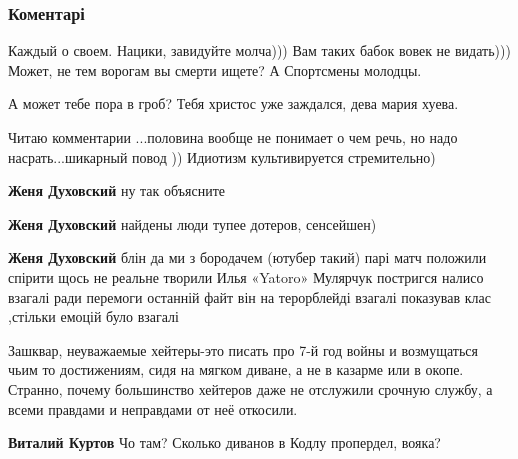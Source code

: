  
 
 
 
 

\clearpage
\subsubsection{Коментарі}

\begin{itemize} %

Каждый о своем. Нацики, завидуйте молча))) Вам таких бабок вовек не видать)))
Может, не тем ворогам вы смерти ищете? А Спортсмены молодцы.

\begin{itemize} %
А может тебе пора в гроб? Тебя христос уже заждался, дева мария хуева.
\end{itemize} %


Читаю комментарии ...половина вообще не понимает о чем речь, но надо
насрать...шикарный повод )) Идиотизм культивируется стремительно)

\begin{itemize} %
\textbf{Женя Духовский} ну так объясните


\textbf{Женя Духовский} найдены люди тупее дотеров, сенсейшен)

\textbf{Женя Духовский} блін да ми з бородачем (ютубер такий) парі матч положили спірити щось не реальне творили Илья «Yatoro» Мулярчук постригся налисо взагалі ради перемоги останній файт він на терорблейді взагалі показував клас ,стільки емоцій було взагалі
\end{itemize} %


Зашквар, неуважаемые хейтеры-это писать про 7-й год войны и возмущаться чьим то
достижениям, сидя на мягком диване, а не в казарме или в окопе. Странно, почему
большинство хейтеров даже не отслужили срочную службу, а всеми правдами и
неправдами от неё откосили.

\begin{itemize} %
\textbf{Виталий Куртов} Чо там? Сколько диванов в Кодлу пропердел, вояка?


\end{itemize}
\end{itemize}
